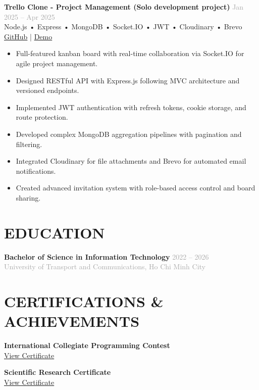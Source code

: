 \documentclass[10pt,a4paper]{article}
\newcommand{\projectitem}[5]{
    \noindent\begin{tcolorbox}[
        colback=white,
        colframe=lightgray,
        boxrule=0.3pt,
        arc=2pt,
        top=3pt,
        bottom=3pt,
        left=6pt,
        right=6pt
    ]
        \noindent\textbf{\color{primary}#1} \hfill \textcolor{darkgray}{\scriptsize#2}\\[1pt]
        {\small\color{secondary}#3}\\[1pt]
        {\scriptsize\color{darkgray}#4}\\[3pt]
        #5
    \end{tcolorbox}
}
\begin{document}
\vspace{3pt}

\projectitem{Trello Clone - Project Management (Solo development project) }{Jan 2025 -- Apr 2025}
    {Node.js • Express • MongoDB • Socket.IO • JWT • Cloudinary • Brevo}
    {\href{https://github.com/dungken}{\textcolor{secondary}{\faGithub* GitHub}} | \href{YOUR_YOUTUBE_DEMO_LINK}{\textcolor{secondary}{\faYoutube* Demo}}}
    {\begin{itemize}[leftmargin=12pt,itemsep=1pt,parsep=0pt,topsep=0pt,after=\vspace{-2pt},label={•}]
        \item Full-featured kanban board with real-time collaboration via Socket.IO for agile project management.
        \item Designed RESTful API with Express.js following MVC architecture and versioned endpoints.
        \item Implemented JWT authentication with refresh tokens, cookie storage, and route protection.
        \item Developed complex MongoDB aggregation pipelines with pagination and filtering.
        \item Integrated Cloudinary for file attachments and Brevo for automated email notifications.
        \item Created advanced invitation system with role-based access control and board sharing.
    \end{itemize}}

\vspace{6pt}

\section{EDUCATION}
\noindent\textbf{Bachelor of Science in Information Technology} \hfill \textcolor{darkgray}{\small 2022 -- 2026}\\[1pt]
\textcolor{darkgray}{\small University of Transport and Communications, Ho Chi Minh City}

\vspace{6pt}

\section{CERTIFICATIONS \& ACHIEVEMENTS}
\begin{minipage}[t]{0.5\textwidth}
    \textbf{\small International Collegiate Programming Contest}\\[1pt]
    \href{https://github.com/dungken/MyResume/blob/master/Certificates/icpc.png}{\textcolor{secondary}{\scriptsize View Certificate}}
\end{minipage}%
\begin{minipage}[t]{0.5\textwidth}
    \textbf{\small Scientific Research Certificate}\\[1pt]
    \href{https://github.com/dungken/MyResume/blob/master/Certificates/nckh.png}{\textcolor{secondary}{\scriptsize View Certificate}}
\end{minipage}
\end{document}
